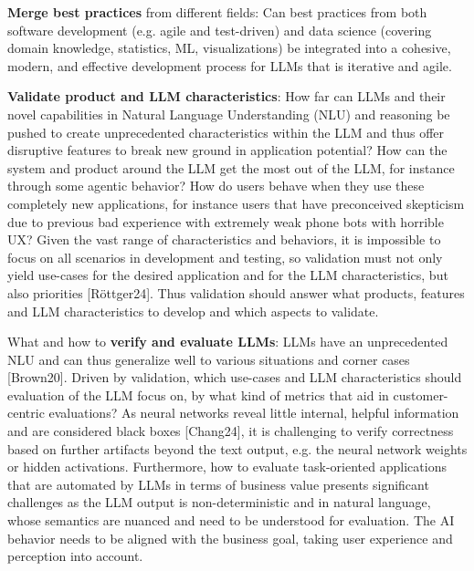 \documentclass[twocolumn]{article}
\begin{document}
\begin{compactenum}
\item {\bfseries Merge best practices} from different fields: Can best practices from both software development (e.g. agile and test-driven) and data science (covering domain knowledge, statistics, ML, visualizations) be integrated into a cohesive, modern, and effective development process for LLMs that is iterative and agile.
\item {\bfseries Validate product and LLM characteristics}: How far can LLMs and their novel capabilities in Natural Language Understanding (NLU) and reasoning be pushed to create unprecedented characteristics within the LLM and thus offer disruptive features to break new ground in application potential? How can the system and product around the LLM get the most out of the LLM, for instance through some agentic behavior? How do users behave when they use these completely new applications, for instance users that have preconceived skepticism due to previous bad experience with extremely weak phone bots with horrible UX? Given the vast range of characteristics and behaviors, it is impossible to focus on all scenarios in development and testing, so validation must not only yield use-cases for the desired application and for the LLM characteristics, but also priorities [Röttger24]. Thus validation should answer what products, features and LLM characteristics to develop and which aspects to validate.
\item What and how to {\bfseries verify and evaluate LLMs}: LLMs have an unprecedented NLU and can thus generalize well to various situations and corner cases [Brown20]. Driven by validation, which use-cases and LLM characteristics should evaluation of the LLM focus on, by what kind of metrics that aid in customer-centric evaluations? As neural networks reveal little internal, helpful information and are considered black boxes [Chang24], it is challenging to verify correctness based on further artifacts beyond the text output, e.g. the neural network weights or hidden activations. Furthermore, how to evaluate task-oriented applications that are automated by LLMs in terms of business value presents significant challenges as the LLM output is non-deterministic and in natural language, whose semantics are nuanced and need to be understood for evaluation. The AI behavior needs to be aligned with the business goal, taking user experience and perception into account.
\end{compactenum}
\end{document}
